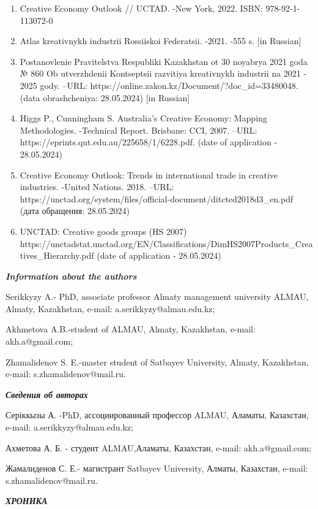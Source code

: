 \begin{enumerate}
\def\labelenumi{\arabic{enumi}.}
\setcounter{enumi}{11}
\item
  Creative Economy Outlook // UCTAD. -New York, 2022. ISBN:
  978-92-1-113072-0
\item
  Atlas kreativnykh industrii Rossiiskoi Federatsii. -2021. -555 s.
  {[}in Russian{]}
\item
  Postanovlenie Pravitel\textquotesingle stva Respubliki Kazakhstan ot
  30 noyabrya 2021 goda № 860 Ob utverzhdenii Kontseptsii razvitiya
  kreativnykh industrii na 2021 - 2025 gody. --URL:
  https://online.zakon.kz/Document/?doc\_id=33480048. (data
  obrashcheniya: 28.05.2024) {[}in Russian{]}
\item
  Higgs P., Cunningham S. Australia's Creative Economy: Mapping
  Methodologies. -Technical Report. Brisbane: CCI, 2007. --URL:
  https://eprints.qut.edu.au/225658/1/6228.pdf. (date of application -
  28.05.2024)
\item
  Creative Economy Outlook: Trends in international trade in creative
  industries. -United Nations. 2018. --URL:
  https://unctad.org/system/files/official-document/ditcted2018d3\_en.pdf
  (дата обращения: 28.05.2024)
\item
  UNCTAD: Creative goods groups (HS 2007)
  https://unctadstat.unctad.org/EN/Classifications/DimHS2007Products\_Creatives\_Hierarchy.pdf
  (date of application - 28.05.2024)
\end{enumerate}

\emph{{\bfseries Information about the authors}}

Serikkyzy A.- PhD, associate professor Almaty management university
ALMAU, Almaty, Kazakhstan, e-mail: a.serikkyzy@almau.edu.kz;

Akhmetova A.B.-student of ALMAU, Almaty, Kazakhstan, e-mail:
akh.a@gmail.com;

Zhamalidenov S. E.-master student of Satbayev University, Almaty,
Kazakhstan, e-mail: s.zhamalidenov@mail.ru.

\emph{{\bfseries Сведения об авторах}}

Серіккызы А. -PhD, ассоциированный профессор ALMAU, Аламаты, Казахстан,
e-mail: a.serikkyzy@almau.edu.kz;

Ахметова А. Б. - студент ALMAU,Аламаты, Казахстан, e-mail:
akh.a@gmail.com;

Жамалиденов С. Е.- магистрант Satbayev University, Алматы, Казахстан,
e-mail: s.zhamalidenov@mail.ru.

\emph{{\bfseries ХРОНИКА}}

